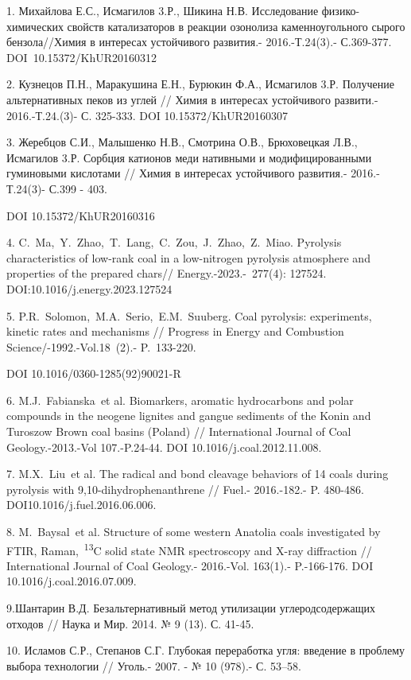 \begin{noparindent}
1. Михайлова Е.С., Исмагилов 3.Р., Шикина Н.В. Исследование
физико-химических свойств катализаторов в реакции озонолиза
каменноугольного сырого бензола//Химия в интересах устойчивого
развития.- 2016.-Т.24(3).- С.369-377. DOI~10.15372/KhUR20160312

2. Кузнецов П.Н., Маракушина Е.Н., Бурюкин Ф.А., Исмагилов 3.Р.
Получение альтернативных пеков из углей // Химия в интересах устойчивого
развити.- 2016.-Т.24.(3)- С. 325-333. DOI 10.15372/KhUR20160307

3. Жеребцов С.И., Малышенко Н.В., Смотрина О.В., Брюховецкая Л.В.,
Исмагилов 3.Р. Сорбция катионов меди нативными и модифицированными
гуминовыми кислотами // Химия в интересах устойчивого развития.-
2016.-Т.24(3)- С.399 - 403.

DOI 10.15372/KhUR20160316

4. C.~Ma,~Y.~Zhao,~T.~Lang,~C.~Zou,~J.~Zhao,~Z.~Miao. Pyrolysis
characteristics of low-rank coal in a low-nitrogen pyrolysis atmosphere
and properties of the prepared chars// Energy.-2023.-~277(4): 127524.
DOI:10.1016/j.energy.2023.127524

5. P.R.~Solomon,~M.A.~Serio,~E.M.~Suuberg. Coal pyrolysis: experiments,
kinetic rates and mechanisms // Progress in Energy and Combustion
Science/-1992.-Vol.18~(2).- P.~133-220.

DOI 10.1016/0360-1285(92)90021-R

6. M.J.~Fabianska\emph{~}et al. Biomarkers, aromatic hydrocarbons and
polar compounds in the neogene lignites and gangue sediments of the
Konin and Turoszow Brown coal basins (Poland) // International Journal
of Coal Geology.-2013.-Vol 107.-P.24-44. DOI 10.1016/j.coal.2012.11.008.

7. M.X.~Liu\emph{~}et al. The radical and bond cleavage behaviors of 14
coals during pyrolysis with 9,10-dihydrophenanthrene // Fuel.-
2016.-182.- P. 480-486. DOI10.1016/j.fuel.2016.06.006.

8. M.~Baysal\emph{~}et al. Structure of some western Anatolia coals
investigated by FTIR, Raman,~\textsuperscript{13}C solid state NMR
spectroscopy and X-ray diffraction // International Journal of Coal
Geology.- 2016.-Vol. 163(1).- P.-166-176. DOI
10.1016/j.coal.2016.07.009.

9.Шантарин В.Д. Безальтернативный метод утилизации углеродсодержащих
отходов // Наука и Мир. 2014. № 9 (13). С. 41-45.

10. Исламов С.Р., Степанов С.Г. Глубокая переработка угля: введение в
проблему выбора технологии // Уголь.- 2007. - № 10 (978).- С. 53--58.


\end{noparindent}
